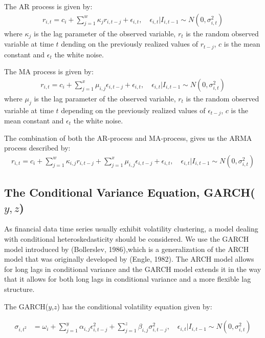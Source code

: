 The AR process is given by:
\begin{align}
    r_{i,t}=c_i + \sum_{j=1}^w\kappa_j r_{i,t-j} + \epsilon_{i,t},\quad \epsilon_{i,t} | I_{i,t-1} \sim N(0,{\sigma_{i,t}^2}) \label{ConditionalMeanEquation}
\end{align}
where $\kappa_j$ is the lag parameter of the observed variable, $r_t$ is the random observed variable at time $t$ dending on the previously realized values of $r_{t-j}$, $c$ is the mean constant and $\epsilon_t$ the white noise.

The MA process is given by:
\begin{align}
    r_{i,t}=c_i + \sum_{j=1}^x\mu_{i,j} \epsilon_{i,t-j} + \epsilon_{i,t},\quad \epsilon_{i,t} | I_{i,t-1} \sim N(0,{\sigma_{i,t}^2}) \label{ConditionalMeanEquation}
\end{align}
where $\mu_j$ is the lag parameter of the observed variable, $r_t$ is the random observed variable at time $t$ depending on the previously realized values of $\epsilon_{t-j}$, $c$ is the mean constant and $\epsilon_t$ the white noise.

The combination of both the AR-process and MA-process, gives us the ARMA process described by:
\begin{align}
    r_{i,t}=c_i+\sum_{j=1}^w\kappa_{i,j} r_{i,t-j}+\sum_{j=1}^x\mu_{i,j} \epsilon_{i,t-j}+\epsilon_{i,t},\quad \epsilon_{i,t} | I_{i,t-1} \sim N(0,{\sigma_{i,t}^2}) \label{ConditionalMeanEquation}
\end{align}

\subsection*{The Conditional Variance Equation, GARCH($y,z$)}
As financial data time series usually exhibit volatility clustering, a model dealing with
conditional heteroskedasticity should be considered. We use the GARCH model introduced by (Bollerslev, 1986),which is a generalization of the ARCH model that was originally developed by (Engle, 1982). The ARCH model allows for long lags in conditional variance and the GARCH model extends it in the way that it allows for both long lags in conditional variance and a more flexible lag structure.

The GARCH($y$,$z$) has the conditional volatility equation given by:

\begin{align}
    \sigma_{i,t^2} &= \omega_i + \sum_{j=1}^y\alpha_{i,j}\epsilon_{i,t-j}^2+\sum_{j=1}^z\beta_{i,j}\sigma_{i,t-j}^2,\quad\epsilon_{i,t} | I_{i,t-1} \sim N(0,{\sigma_{i,t}^2}) \label{ConditionalVolatilityEquation}
\end{align}

